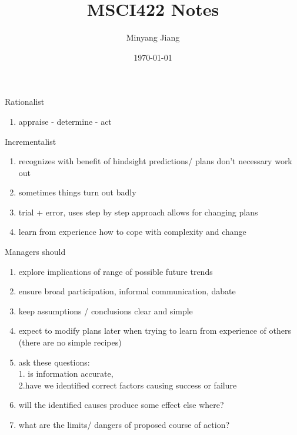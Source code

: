 \documentclass[12pt, a4paper]{article}
\title{\huge MSCI422 Notes}
\author{Minyang Jiang}
\date{\today}
\newcommand{\NP}{\newpage \vspace*{-0.4in}}
\begin{document}
\maketitle
\NP
Rationalist
\begin{enumerate}
  \item appraise - determine - act
\end{enumerate}
Incrementalist
\begin{enumerate}
  \item recognizes with benefit of hindsight predictions/ plans don't necessary work out
  \item sometimes things turn out badly
  \item trial + error, uses step by step approach allows for changing plans
  \item learn from experience how to cope with complexity and change
\end{enumerate}
Managers should
\begin{enumerate}
  \item explore implications of range of possible future trends
  \item ensure broad participation, informal communication, dabate
  \item keep assumptions / conclusions clear and simple
  \item expect to modify plans later when trying to learn from experience of others (there are no simple recipes)
  \item ask these questions: \\1. is information accurate,\\ 2.have we identified correct factors causing success or failure
  \item will the identified causes produce some effect else where?
  \item what are the limits/ dangers of proposed course of action?
\end{enumerate}
\end{document}
